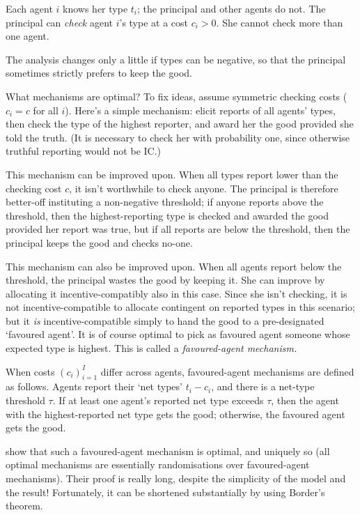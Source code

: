 Each agent $i$ knows her type $t_i$; the principal and other agents do not.
The principal can \emph{check} agent $i$'s type at a cost $c_i>0$.
She cannot check more than one agent.

\begin{remark}
	\label{remark:bdl14_extensions}
	The analysis changes only a little if types can be negative, so that the principal sometimes strictly prefers to keep the good.
\end{remark}

What mechanisms are optimal?
To fix ideas, assume symmetric checking costs ($c_i = c$ for all $i$).
Here's a simple mechanism: elicit reports of all agents' types, then check the type of the highest reporter, and award her the good provided she told the truth. (It is necessary to check her with probability one, since otherwise truthful reporting would not be IC.)

This mechanism can be improved upon.
When all types report lower than the checking cost $c$, it isn't worthwhile to check anyone.
The principal is therefore better-off instituting a non-negative threshold;
if anyone reports above the threshold, then the highest-reporting type is checked and awarded the good provided her report was true,
but if all reports are below the threshold, then the principal keeps the good and checks no-one.

This mechanism can also be improved upon.
When all agents report below the threshold, the principal wastes the good by keeping it. She can improve by allocating it incentive-compatibly also in this case.
Since she isn't checking, it is not incentive-compatible to allocate contingent on reported types in this scenario; but it \emph{is} incentive-compatible simply to hand the good to a pre-designated `favoured agent'.
It is of course optimal to pick as favoured agent someone whose expected type is highest.
This is called a \emph{favoured-agent mechanism.}

When costs $(c_i)_{i=1}^I$ differ across agents, favoured-agent mechanisms are defined as follows.
Agents report their `net types' $t_i-c_i$,
and there is a net-type threshold $\tau$.
If at least one agent's reported net type exceeds $\tau$,
then the agent with the highest-reported net type gets the good;
otherwise, the favoured agent gets the good.

\textcite{BenporathDekelLipman2014} show that such a favoured-agent mechanism is optimal,
and uniquely so (all optimal mechanisms are essentially randomisations over favoured-agent mechanisms).
Their proof is really long, despite the simplicity of the model and the result!
Fortunately, it can be shortened substantially by using Border's theorem.



